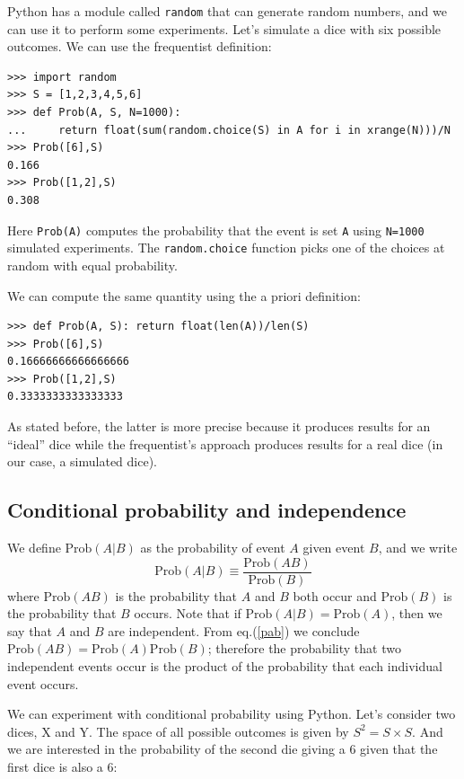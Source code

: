 \documentclass[justified,sixbynine]{tufte-book}
\def\ft{\small\tt}
\theoremstyle{plain}%
\theoremstyle{definition}
\theoremstyle{remark}
\begin{document}
\begin{fullwidth}
Python has a module called {\ft random} that can generate random numbers, and we can use it to perform some experiments.
Let's simulate a dice with six possible outcomes.
We can use the frequentist definition:

\begin{lstlisting}[caption={in file: {\ft nlib.py}}]
>>> import random
>>> S = [1,2,3,4,5,6]
>>> def Prob(A, S, N=1000):
...     return float(sum(random.choice(S) in A for i in xrange(N)))/N
>>> Prob([6],S)
0.166
>>> Prob([1,2],S)
0.308
\end{lstlisting}
Here {\ft \textrm{Prob}(A)} computes the probability that the event is set {\ft A} using {\ft N=1000} simulated experiments.
The {\ft random.choice} function picks one of the choices at random with equal probability.

We can compute the same quantity using the a priori definition:

\begin{lstlisting}[caption={in file: {\ft nlib.py}}]
>>> def Prob(A, S): return float(len(A))/len(S)
>>> Prob([6],S)
0.16666666666666666
>>> Prob([1,2],S)
0.3333333333333333
\end{lstlisting}

As stated before, the latter is more precise because it produces results for an ``ideal'' dice while the frequentist's approach produces results for a real dice (in our case, a simulated dice).

\goodbreak\subsection{Conditional probability and independence}

We define $\textrm{Prob}(A|B)$ as the probability of event $A$ given event $B$, and we
write
\begin{equation}
\textrm{Prob}(A|B)\equiv \frac{\textrm{Prob}(AB)}{\textrm{Prob}(B)}  \label{pab}
\end{equation}
where $\textrm{Prob}(AB)$ is the probability that $A$ and $B$ both occur and $\textrm{Prob}(B)$ is
the probability that $B$ occurs. Note that if $\textrm{Prob}(A|B)=\textrm{Prob}(A)$, then we say
that $A$ and $B$ are independent. From eq.(\ref{pab})
we conclude $\textrm{Prob}(AB)=\textrm{Prob}(A)\textrm{Prob}(B)$; therefore the probability that two
independent events occur is the product of the probability that each individual event
occurs.

We can experiment with conditional probability using Python. Let's consider two dices, X and Y.
The space of all possible outcomes is given by $S^2 = S \times S$.
And we are interested in the probability of the second die giving a $6$ given that the first dice is also a $6$:


\end{fullwidth}
\end{document}

